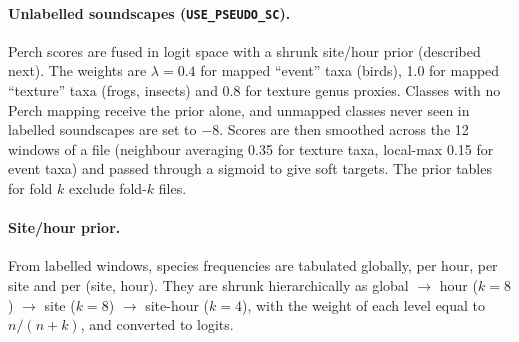 \documentclass[11pt]{article}
\newcommand{\var}[1]{\texttt{#1}}
\begin{document}
\paragraph{Unlabelled soundscapes (\var{USE\_PSEUDO\_SC}).} Perch scores are
fused in logit space with a shrunk site/hour prior (described next). The
weights are $\lambda=0.4$ for mapped ``event'' taxa (birds), 1.0 for mapped
``texture'' taxa (frogs, insects) and 0.8 for texture genus proxies. Classes
with no Perch mapping receive the prior alone, and unmapped classes never seen
in labelled soundscapes are set to $-8$. Scores are then smoothed across the
12 windows of a file (neighbour averaging 0.35 for texture taxa, local-max
0.15 for event taxa) and passed through a sigmoid to give soft targets. The
prior tables for fold $k$ exclude fold-$k$ files.

\paragraph{Site/hour prior.} From labelled windows, species frequencies are
tabulated globally, per hour, per site and per (site, hour). They are shrunk
hierarchically as global $\rightarrow$ hour ($k=8$) $\rightarrow$ site ($k=8$)
$\rightarrow$ site-hour ($k=4$), with the weight of each level equal to
$n/(n+k)$, and converted to logits.
\end{document}
